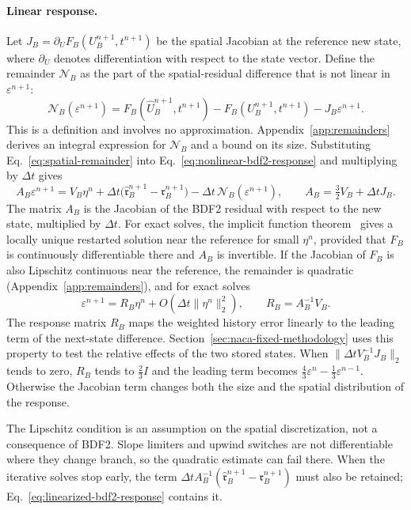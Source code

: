\documentclass[a4paper,fleqn]{cas-sc}
\newcommand{\eps}{\varepsilon}
\begin{document}
\paragraph{Linear response.}
Let $J_B=\partial_U F_B(U_B^{n+1},t^{n+1})$ be the spatial Jacobian at the reference new state, where $\partial_U$ denotes differentiation with respect to the state vector. Define the remainder $\mathcal N_B$ as the part of the spatial-residual difference that is not linear in $\eps^{n+1}$:
\begin{equation}
 \mathcal N_B(\eps^{n+1})
 =F_B(\widehat U_B^{n+1},t^{n+1})-F_B(U_B^{n+1},t^{n+1})-J_B\eps^{n+1}.
\label{eq:spatial-remainder}
\end{equation}
This is a definition and involves no approximation. Appendix~\ref{app:remainders} derives an integral expression for $\mathcal N_B$ and a bound on its size. Substituting Eq.~\eqref{eq:spatial-remainder} into Eq.~\eqref{eq:nonlinear-bdf2-response} and multiplying by $\Delta t$ gives
\begin{equation}
 A_B\eps^{n+1}
 =V_B\eta^n+\Delta t\bigl(\widehat{\mathfrak r}_B^{n+1}-\mathfrak r_B^{n+1}\bigr)
                 -\Delta t\,\mathcal N_B(\eps^{n+1}),
 \qquad A_B=\tfrac32V_B+\Delta t J_B.
 \label{eq:linearized-bdf2-response}
\end{equation}
The matrix $A_B$ is the Jacobian of the BDF2 residual with respect to the new state, multiplied by $\Delta t$. For exact solves, the implicit function theorem~\cite{OrtegaRheinboldt2000} gives a locally unique restarted solution near the reference for small $\eta^n$, provided that $F_B$ is continuously differentiable there and $A_B$ is invertible. If the Jacobian of $F_B$ is also Lipschitz continuous near the reference, the remainder is quadratic (Appendix~\ref{app:remainders}), and for exact solves
\begin{equation}
 \eps^{n+1}=R_B\eta^n+O(\Delta t\|\eta^n\|_2^2),
 \qquad R_B=A_B^{-1}V_B.
 \label{eq:state-response}
\end{equation}
The response matrix $R_B$ maps the weighted history error linearly to the leading term of the next-state difference. Section~\ref{sec:naca-fixed-methodology} uses this property to test the relative effects of the two stored states. When $\|\Delta t V_B^{-1}J_B\|_2$ tends to zero, $R_B$ tends to $\tfrac23I$ and the leading term becomes $\tfrac43\eps^n-\tfrac13\eps^{n-1}$. Otherwise the Jacobian term changes both the size and the spatial distribution of the response.

The Lipschitz condition is an assumption on the spatial discretization, not a consequence of BDF2. Slope limiters and upwind switches are not differentiable where they change branch, so the quadratic estimate can fail there. When the iterative solves stop early, the term $\Delta t A_B^{-1}(\widehat{\mathfrak r}_B^{n+1}-\mathfrak r_B^{n+1})$ must also be retained; Eq.~\eqref{eq:linearized-bdf2-response} contains it.
\end{document}
